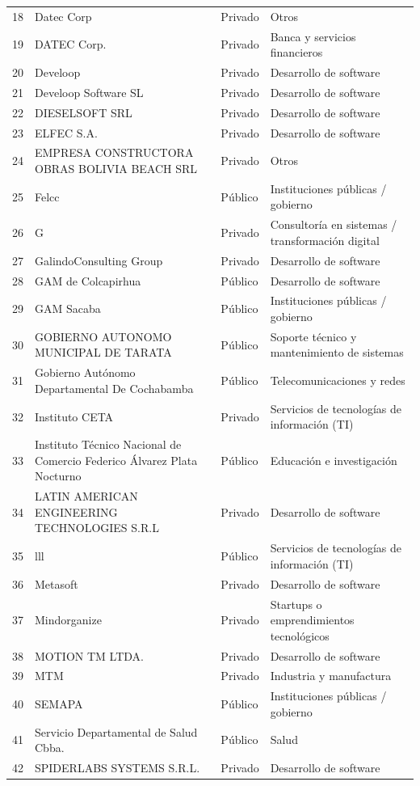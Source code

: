 {\begin{longtable}{rL{6.2cm}lL{4.6cm}}
18 & Datec Corp & Privado & Otros \\
19 & DATEC Corp. & Privado & Banca y servicios financieros \\
20 & Develoop & Privado & Desarrollo de software \\
21 & Develoop Software SL & Privado & Desarrollo de software \\
22 & DIESELSOFT SRL & Privado & Desarrollo de software \\
23 & ELFEC S.A. & Privado & Desarrollo de software \\
24 & EMPRESA CONSTRUCTORA OBRAS BOLIVIA BEACH SRL & Privado & Otros \\
25 & Felcc & Público & Instituciones públicas / gobierno \\
26 & G & Privado & Consultoría en sistemas / transformación digital \\
27 & GalindoConsulting Group & Privado & Desarrollo de software \\
28 & GAM de Colcapirhua & Público & Desarrollo de software \\
29 & GAM Sacaba & Público & Instituciones públicas / gobierno \\
30 & GOBIERNO AUTONOMO MUNICIPAL DE TARATA & Público & Soporte técnico y mantenimiento de sistemas \\
31 & Gobierno Autónomo Departamental De Cochabamba & Público & Telecomunicaciones y redes \\
32 & Instituto CETA & Privado & Servicios de tecnologías de información (TI) \\
33 & Instituto Técnico Nacional de Comercio Federico Álvarez Plata Nocturno & Público & Educación e investigación \\
34 & LATIN AMERICAN ENGINEERING TECHNOLOGIES S.R.L & Privado & Desarrollo de software \\
35 & lll & Público & Servicios de tecnologías de información (TI) \\
36 & Metasoft & Privado & Desarrollo de software \\
37 & Mindorganize & Privado & Startups o emprendimientos tecnológicos \\
38 & MOTION TM LTDA. & Privado & Desarrollo de software \\
39 & MTM & Privado & Industria y manufactura \\
40 & SEMAPA & Público & Instituciones públicas / gobierno \\
41 & Servicio Departamental de Salud Cbba. & Público & Salud \\
42 & SPIDERLABS SYSTEMS S.R.L. & Privado & Desarrollo de software \\

\end{longtable}}
